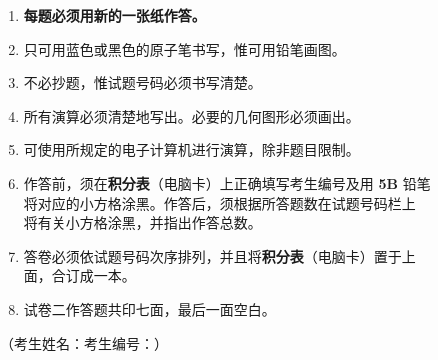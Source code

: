 \documentclass[12pt,a4paper]{exam-zh}
\newcommand{\ulinefill}[1]{\underline{\hspace{#1}}}
\begin{document}
\begin{samepage}
\begin{enumerate}[label=（\arabic*）,leftmargin=2.8em,itemsep=0.38em]
  \item \textbf{每题必须用新的一张纸作答。}

  \item 只可用蓝色或黑色的原子笔书写，惟可用铅笔画图。

  \item 不必抄题，惟试题号码必须书写清楚。

  \item 所有演算必须清楚地写出。必要的几何图形必须画出。

  \item 可使用所规定的电子计算机进行演算，除非题目限制。

  \item 作答前，须在\textbf{积分表}（电脑卡）上正确填写考生编号及用 \textbf{5B} 铅笔\\
  将对应的小方格涂黑。作答后，须根据所答题数在试题号码栏上\\
  将有关小方格涂黑，并指出作答总数。

  \item 答卷必须依试题号码次序排列，并且将\textbf{积分表}（电脑卡）置于上\\
  面，合订成一本。

  \item 试卷二作答题共印七面，最后一面空白。
\end{enumerate}

\vspace{1.0em}

\begin{center}
  \fbox{\rule{0pt}{1.15em}\hspace{1.2em}{\bfseries 未经正式宣布\quad 不得翻看内页}\hspace{1.2em}}
\end{center}

\vspace{1.2em}

\noindent
（考生姓名：\ulinefill{4.4cm}\hfill 考生编号：\ulinefill{4.3cm}）

\vfill


\end{samepage}
\end{document}
